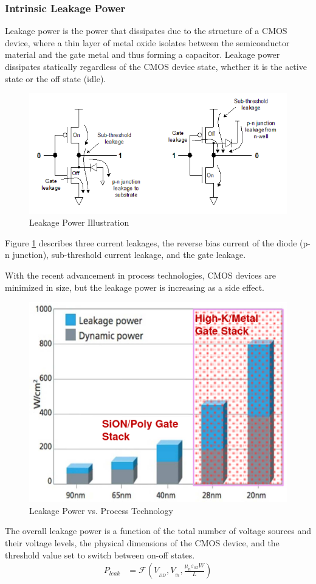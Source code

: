 \subsubsection{Intrinsic Leakage Power}
Leakage power is the power that dissipates due to the 
structure of a CMOS device, 
where a thin layer of metal oxide isolates
between the semiconductor material and the
gate metal and thus forming a capacitor. 
Leakage power dissipates statically regardless of the CMOS 
device state, 
whether it is the active state or the off state (idle).

\begin{figure}[H]
    \centering
    \includegraphics[width=0.75\linewidth]{Features/images/leak_power_schem}
    \caption{Leakage Power Illustration}\label{fig:leak_power_schem}
\end{figure}

Figure \ref{fig:leak_power_schem} describes three current leakages,
the reverse bias current of the diode (p-n junction), sub-threshold current leakage, and
the gate leakage.

With the recent advancement in process technologies, 
CMOS devices are minimized in size, 
but the leakage power is increasing as a side effect.
\begin{figure}[H]
    \centering
    \includegraphics[width=0.55\linewidth]{Features/images/leak_vs_nm}
    \caption{Leakage Power vs. Process Technology}\label{fig:leak_vs_nm}
\end{figure}
The overall leakage power is a function 
of the total number of voltage sources and their voltage levels, 
the physical dimensions of the CMOS device, 
and the threshold value set to switch between on-off states.
\begin{align}
    P_{leak} & = \mathcal{F} (V_{_{DD}}, V_{_{th}}, \frac{\mu_{n}\varepsilon_{ox} W}{L})
\end{align}

